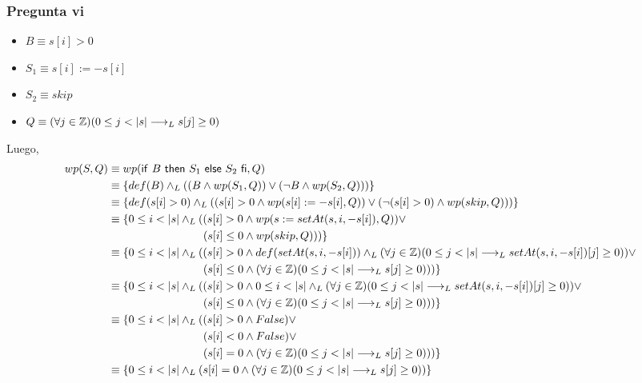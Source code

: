\subsubsection{Pregunta vi}
\begin{itemize}
    \item $ B \equiv s[i] > 0 $
    \item $ S_1 \equiv s[i] := -s[i] $
    \item $ S_2 \equiv skip $
    \item $ Q \equiv (\forall j \in \mathbb{Z})(0 \leq j < |s| \longrightarrow _L s[j] \geq 0) $
\end{itemize}
Luego,
\begin{align*}
    wp(S, Q) &\equiv wp(\mathsf{if}\ B\ \mathsf{then}\ S_1\ \mathsf{else}\ S_2\ \mathsf{fi}, Q) \\
    &\equiv \{ def(B) \land _L ((B \wedge wp(S_1, Q)) \vee (\neg B \wedge wp(S_2, Q))) \} \\
    &\equiv \{ def(s[i] > 0) \land _L ((s[i] > 0 \wedge wp(s[i] := -s[i], Q)) \vee (\neg (s[i] > 0) \wedge wp(skip, Q))) \} \\
    &\equiv \{ 0 \leq i < |s| \land _L ((s[i] > 0 \wedge wp(s:= setAt(s, i, -s[i]), Q)) \vee \\
    &\qquad \qquad \qquad \qquad \; \: (s[i] \leq 0 \wedge wp(skip, Q))) \} \\
    &\equiv \{ 0 \leq i < |s| \land _L ((s[i] > 0 \wedge def(setAt(s, i, -s[i])) \land _L (\forall j \in \mathbb{Z})(0 \leq j < |s| \longrightarrow _L setAt(s, i, -s[i])[j] \geq 0)) \vee \\
    &\qquad \qquad \qquad \qquad \; \: (s[i] \leq 0 \wedge (\forall j \in \mathbb{Z})(0 \leq j < |s| \longrightarrow _L s[j] \geq 0))) \} \\
    &\equiv \{ 0 \leq i < |s| \land _L ((s[i] > 0 \wedge 0 \leq i < |s| \land _L (\forall j \in \mathbb{Z})(0 \leq j < |s| \longrightarrow _L setAt(s, i, -s[i])[j] \geq 0)) \vee \\
    &\qquad \qquad \qquad \qquad \; \: (s[i] \leq 0 \wedge (\forall j \in \mathbb{Z})(0 \leq j < |s| \longrightarrow _L s[j] \geq 0))) \} \\
    &\equiv \{ 0 \leq i < |s| \land _L ((s[i] > 0 \wedge False) \vee \\
    &\qquad \qquad \qquad \qquad \; \: (s[i] < 0 \wedge False) \vee \\
    &\qquad \qquad \qquad \qquad \; \: (s[i] = 0 \wedge (\forall j \in \mathbb{Z})(0 \leq j < |s| \longrightarrow _L s[j] \geq 0))) \} \\
    &\equiv \{ 0 \leq i < |s| \land _L (s[i] = 0 \wedge (\forall j \in \mathbb{Z})(0 \leq j < |s| \longrightarrow _L s[j] \geq 0)) \} \\
\end{align*}

